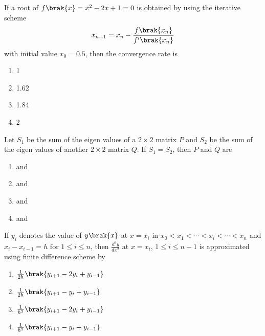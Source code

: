 \item If a root of $f\brak{x} = x^2 - 2x + 1 = 0$ is obtained by using the iterative scheme 
\begin{align*}
    x_{n+1} = x_n - \frac{f\brak{x_n}}{f'\brak{x_n}}
\end{align*} with initial value $x_0 = 0.5$, then the convergence rate is
\begin{enumerate}
    \item 1
    \item 1.62
    \item 1.84
    \item 2 \\
\end{enumerate}
\item Let $S_1$ be the sum of the eigen values of a $2 \times 2$ matrix $P$ and $S_2$ be the sum of the eigen values of another $2 \times 2$ matrix $Q$. If $S_1 = S_2$, then $P$ and $Q$ are
\begin{enumerate}
    \item {} and 
    \item {} and 
    \item {} and 
    \item {} and  \\
\end{enumerate}
\item If $y_i$ denotes the value of $y\brak{x}$ at $x = x_i$ in $x_0 < x_1 < \cdots < x_i < \cdots < x_n$ and $x_i - x_{i-1} = h$ for $1 \leq i \leq n$, then $\frac{d^2y}{dx^2}$ at $x = x_i$, $1 \leq i \leq n-1$ is approximated using finite difference scheme by 
\begin{enumerate}
    \item $\frac{1}{2h}\brak{y_{i+1} - 2y_i + y_{i-1}}$
    \item $\frac{1}{2h}\brak{y_{i+1} - y_i + y_{i-1}}$
    \item $\frac{1}{h^2}\brak{y_{i+1} - 2y_i + y_{i-1}}$
    \item $\frac{1}{h^2}\brak{y_{i+1} - y_i + y_{i-1}}$ \\
\end{enumerate}
